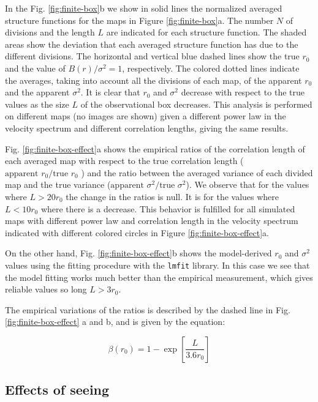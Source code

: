 \documentclass[fleqn,usenatbib, useAMS, a4paper]{mnras}
\begin{document}
In the Fig. \ref{fig:finite-box}b we show in solid lines the normalized averaged structure functions for the maps in Figure \ref{fig:finite-box}a.
The number \(N\) of divisions and the length \(L\) are indicated for each structure function.
The shaded areas show the deviation that each averaged structure function has due to the different divisions. 
The horizontal and vertical blue dashed lines show the true \(r_{0}\) and the value of \(B(r) / \sigma^2 = 1 \), respectively.
The colored dotted lines indicate the averages, taking into account all the divisions of each map, of the apparent \(r_ {0}\) and the apparent \(\sigma^2 \).
It is clear that \(r_0\) and \(\sigma^ 2 \) decrease with respect to the true values as the size \(L\) of the observational box decreases. 
This analysis is performed on different maps (no images are shown) given a different power law in the velocity spectrum and different correlation lengths, giving the same results. 

Fig. \ref{fig:finite-box-effect}a shows the empirical ratios of the correlation length of each averaged map with respect to the true correlation length (\(\text{apparent } r_ 0 /\text{true } r_0 \) ) and the ratio between the averaged variance of each divided map and the true variance (\(\text{apparent } \sigma^2  / \text{true } \sigma^2\)).
We observe that for the values where \(L> 20r_0 \) the change in the ratios is null.
It is for the values where \( L < 10 r_0 \) where there is a decrease.
This behavior is fulfilled for all simulated maps with different power law and correlation length in the velocity spectrum indicated with different colored circles in Figure \ref{fig:finite-box-effect}a.

On the other hand, Fig. \ref{fig:finite-box-effect}b shows the model-derived \(r_0\) and \(\sigma^ 2 \) values using the fitting procedure with the \texttt{lmfit} library.
In this case we see that the model fitting works much better than the empirical measurement, which gives reliable values so long \(L > 3r_0 \).

The empirical variations of the ratios is described by the  dashed line in Fig. \ref{fig:finite-box-effect} a and b, and is given by the equation: 

\begin{equation}\label{eq:ajustebox}
\beta(r_0) = 1 - \exp \left[ \frac{L}{3.6r_0} \right] 
\end{equation}

\subsection{Effects of seeing}
\label{sec:effects-seeing-struc}
\end{document}

